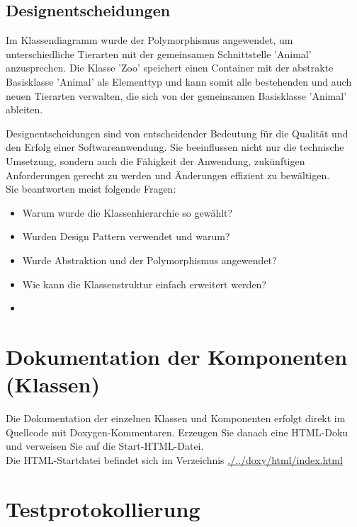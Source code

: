 \documentclass[12pt,naustrian,a4widepaper]{scrartcl}
\begin{document}
\subsection{Designentscheidungen}
	Im Klassendiagramm wurde der Polymorphismus angewendet, um unterschiedliche Tierarten mit der gemeinsamen Schnittstelle 'Animal' anzusprechen. Die Klasse 'Zoo' speichert einen Container mit der abstrakte Basisklasse 'Animal' als Elementtyp und kann somit alle bestehenden und auch neuen Tierarten verwalten, die sich von der gemeinsamen Basisklasse 'Animal' ableiten.

\color{blue}
Designentscheidungen sind von entscheidender Bedeutung für die Qualität und den Erfolg einer Softwareanwendung. Sie beeinflussen nicht nur die technische Umsetzung, sondern auch die Fähigkeit der Anwendung, zukünftigen Anforderungen gerecht zu werden und Änderungen effizient zu bewältigen.\\
Sie beantworten meist folgende Fragen:\\
\begin{itemize}
	\item Warum wurde die Klassenhierarchie so gewählt?
	\item Wurden Design Pattern verwendet und warum?
	\item Wurde Abstraktion und der Polymorphismus angewendet?
	\item Wie kann die Klassenstruktur einfach erweitert werden?
	\item 
\end{itemize}

\color{black}

\section{Dokumentation der Komponenten (Klassen)}
\color{blue}
Die Dokumentation der einzelnen Klassen und Komponenten erfolgt direkt im Quellcode mit Doxygen-Kommentaren. Erzeugen Sie danach 
eine HTML-Doku und verweisen Sie auf die Start-HTML-Datei.\\

\color{black}
Die HTML-Startdatei befindet sich im Verzeichnis \href{run:./../doxy/html/index.html}{./../doxy/html/index.html}

\clearpage
\section{Testprotokollierung}
\end{document}
